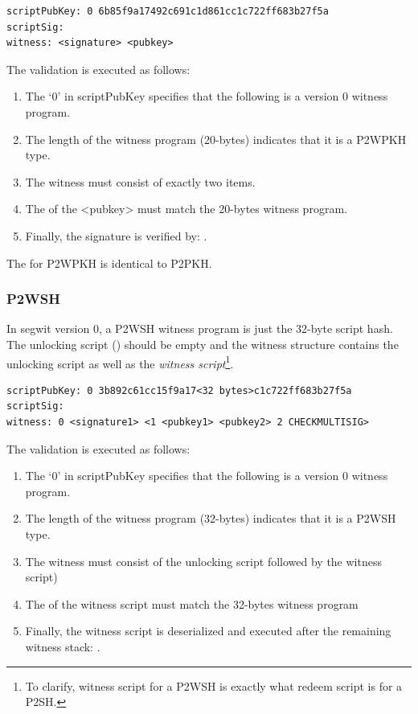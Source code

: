 \begin{emphbox}
\begin{lstlisting}[style=Pseudomath]
scriptPubKey: 0 6b85f9a17492c691c1d861cc1c722ff683b27f5a
scriptSig:
witness: <signature> <pubkey>
\end{lstlisting}
\end{emphbox}

The validation is executed as follows:
\begin{enumerate}
\item The `0' in scriptPubKey specifies that the following is a version 0 witness program.
\item The length of the witness program (20-bytes) indicates that it is a P2WPKH type.
\item The witness must consist of exactly two items.
\item The  of the <pubkey> must match the 20-bytes witness program.
\item Finally, the signature is verified by: .
\end{enumerate}

The  for P2WPKH is identical to P2PKH.


\subsubsection*{P2WSH}
In segwit version 0, a P2WSH witness program is just the 32-byte script hash. The unlocking script () should be empty and the witness structure contains the unlocking script as well as the \emph{witness script}\footnote{To clarify, witness script for a P2WSH is exactly what redeem script is for a P2SH.}.

\begin{emphbox}
\begin{lstlisting}[style=Pseudomath]
scriptPubKey: 0 3b892c61cc15f9a17<32 bytes>c1c722ff683b27f5a
scriptSig:
witness: 0 <signature1> <1 <pubkey1> <pubkey2> 2 CHECKMULTISIG>
\end{lstlisting}
\end{emphbox}

The validation is executed as follows:
\begin{enumerate}
\item The `0' in scriptPubKey specifies that the following is a version 0 witness program.
\item The length of the witness program (32-bytes) indicates that it is a P2WSH type.
\item The witness must consist of the unlocking script followed by the witness script) 
\item The  of the witness script must match the 32-bytes witness program
\item Finally, the witness script is deserialized and executed after the remaining witness stack: .
\end{enumerate}

